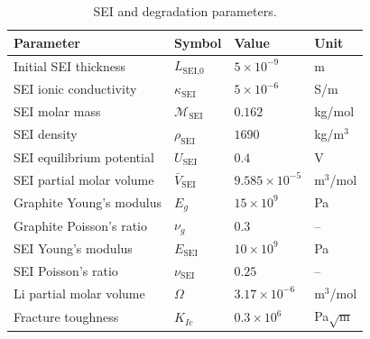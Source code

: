 \begin{table}[H]
\centering
\caption{SEI and degradation parameters.}
\label{tab:params_degradation}
\begin{tabular}{llll}
\toprule
\textbf{Parameter} & \textbf{Symbol} & \textbf{Value} & \textbf{Unit} \\
\midrule
Initial SEI thickness & $L_\text{SEI,0}$ & $5\times10^{-9}$ & m \\
SEI ionic conductivity & $\kappa_\text{SEI}$ & $5\times10^{-6}$ & S/m \\
SEI molar mass & $\mathcal{M}_\text{SEI}$ & $0.162$ & kg/mol \\
SEI density & $\rho_\text{SEI}$ & $1690$ & kg/m$^3$ \\
SEI equilibrium potential & $U_\text{SEI}$ & $0.4$ & V \\
SEI partial molar volume & $\bar{V}_\text{SEI}$ & $9.585\times10^{-5}$ & m$^3$/mol \\
Graphite Young's modulus & $E_g$ & $15\times10^9$ & Pa \\
Graphite Poisson's ratio & $\nu_g$ & $0.3$ & -- \\
SEI Young's modulus & $E_\text{SEI}$ & $10\times10^9$ & Pa \\
SEI Poisson's ratio & $\nu_\text{SEI}$ & $0.25$ & -- \\
Li partial molar volume & $\Omega$ & $3.17\times10^{-6}$ & m$^3$/mol \\
Fracture toughness & $K_{Ic}$ & $0.3\times10^6$ & Pa$\sqrt{\text{m}}$ \\
\bottomrule
\end{tabular}
\end{table}
